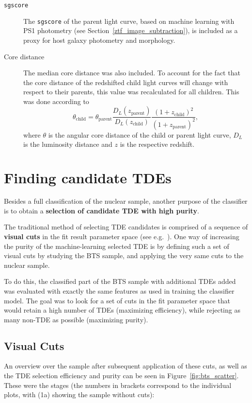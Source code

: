 \begin{description}
    \item[\texttt{sgscore}] The \texttt{sgscore} of the parent light curve, based on machine learning with PS1 photometry (see Section~\ref{ztf_image_subtraction}), is included as a proxy for host galaxy photometry and morphology.
    \item[Core distance] The median core distance was also included. To account for the fact that the core distance of the redshifted child light curves will change with respect to their parents, this value was recalculated for all children. This was done according to
        \begin{equation}
            \theta_\text{child} = \theta_\text{parent} \frac{D_L(z_\text{parent})}{D_L(z_\text{child})} \frac{(1+z_\text{child})^2}{(1+z_\text{parent})^2},
        \end{equation}
        where $\theta$ is the angular core distance of the child or parent light curve, $D_L$ is the luminosity distance and $z$ is the respective redshift.
\end{description}

\section{Finding candidate TDEs}
Besides a full classification of the nuclear sample, another purpose of the classifier is to obtain a \textbf{selection of candidate TDE with high purity}.

The traditional method of selecting TDE candidates is comprised of a sequence of \textbf{visual cuts} in the fit result parameter space (see e.g.~\cite{Velzen2019}). One way of increasing the purity of the machine-learning selected TDE is by defining such a set of visual cuts by studying the BTS sample, and applying the very same cuts to the nuclear sample.

To do this, the classified part of the BTS sample with additional TDEs added was evaluated with exactly the same features as used in training the classifier model. The goal was to look for a set of cuts in the fit parameter space that would retain a high number of TDEs (maximizing efficiency), while rejecting as many non-TDE as possible (maximizing purity).

\subsection{Visual Cuts}
An overview over the sample after subsequent application of these cuts, as well as the TDE selection efficiency and purity can be seen in Figure~\ref{fig:bts_scatter}. These were the stages (the numbers in brackets correspond to the individual plots, with (1a) showing the sample without cuts):

